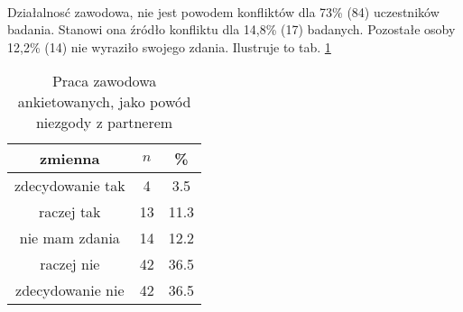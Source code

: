 
\

Działalnosć zawodowa, nie jest powodem konfliktów dla 73\% (84) uczestników badania. Stanowi ona źródło konfliktu dla 14,8\% (17) badanych. Pozostałe osoby 12,2\% (14) nie wyraziło swojego zdania. Ilustruje to tab. \ref{tab:Q28}


\begin{table}[H]
\caption{Praca zawodowa ankietowanych, jako powód niezgody z partnerem}
\centering
\begin{tabular}{ | c | c | c |}
\hline
zmienna & $n$ & \% \\
\hline
zdecydowanie tak  &  4  & 3.5 \\
\hline
raczej tak  &  13  & 11.3 \\
\hline
nie mam zdania  &  14  & 12.2 \\
\hline
raczej nie  &  42  & 36.5 \\
\hline
zdecydowanie nie  &  42  & 36.5\\
\hline
\end{tabular}
\label{tab:Q28}
\end{table}
